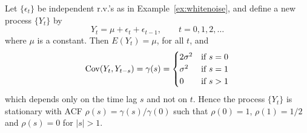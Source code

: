 \begin{ex} \label{ex:movingaverage} Let $\{\epsilon_t\}$ be independent r.v.'s as in Example~\ref{ex:whitenoise}, and define a new process $\{Y_t\}$ by
	\[
	Y_t = \mu + \epsilon_t + \epsilon_{t-1}, \qquad t=0, 1, 2, \ldots
	\]
where $\mu$ is a constant.  Then $E(Y_t)=\mu$, for all $t$, and
	\[
	\operatorname{Cov}(Y_t,Y_{t-s})=\gamma(s)=
	\begin{cases}
	 2\sigma^2 & \text{if } s=0 \\
	  \sigma^2 & \text{if } s=1 \\
	  0 & \text{if } s>1 \\
	\end{cases}
	\]
which depends only on the time lag $s$ and not on $t$.  Hence the process $\{Y_t\}$ is stationary with ACF $\rho(s)=\gamma(s)/\gamma(0)$ such that $\rho(0)=1$, $\rho(1)=1/2$ and $\rho(s)=0$ for $|s|>1$.
 

\end{ex}
